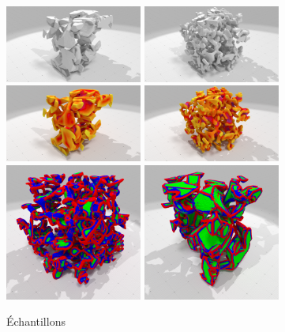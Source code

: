 \begin{figure}[ht]{
    \begin{center}
    \includegraphics[trim={17cm 0 13cm 0},clip,width=4.5cm]{images/digitalSnow/SnowE2_DigitalData}
    \includegraphics[trim={17cm 0 13cm 0},clip,width=4.5cm]{images/digitalSnow/SnowI08_DigitalData}\\
    \includegraphics[trim={17cm 0 13cm 0},clip,width=4.5cm]{images/digitalSnow/snowE2mean_0001}
    \includegraphics[trim={17cm 0 13cm 0},clip,width=4.5cm]{images/digitalSnow/snowI08mean_0001}\\
    \includegraphics[width=4.5cm]{images/digitalSnow/Snow_I08_II_scale}
    \includegraphics[width=4.5cm]{images/digitalSnow/Snow_E2bis_II_scale}\\
    \end{center}}
    \caption{Échantillons
      \label{fig:digitalSnow-curv}}
\end{figure}

